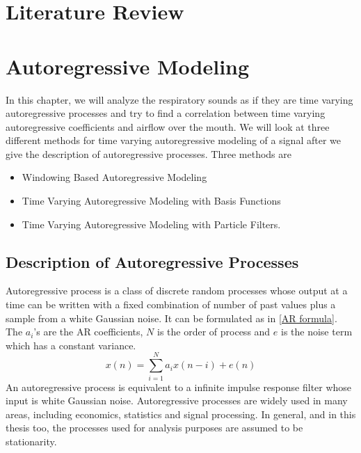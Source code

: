 \documentclass[a4paper,onesided,12pt]{report}
\begin{document}
\section{Literature Review}
\section{Autoregressive Modeling}
In this chapter, we will analyze the respiratory sounds as if they are time varying autoregressive processes and try to find a correlation between time varying autoregressive coefficients and airflow over the mouth. 
We will look at three different methods for time varying autoregressive modeling of a signal after we give the description of autoregressive processes. Three methods are 
\begin{itemize}
	\item Windowing Based Autoregressive Modeling
	\item Time Varying Autoregressive Modeling with Basis Functions
	\item Time Varying Autoregressive Modeling with Particle Filters.
\end{itemize}
\subsection{Description of Autoregressive Processes}
Autoregressive process is a class of discrete random processes whose output at a time can be written with a fixed combination of number of past values plus a sample from a white Gaussian noise. It can be formulated as in \ref{AR formula}. The $a_{i}$'s are the AR coefficients, $N$ is the order of process and $e$ is the noise term which has a constant variance. 
\begin{equation}\label{AR formula}
x(n) = \sum_{i=1}^{N}{a_ix(n-i)} + e(n) 
\end{equation}
An autoregressive process is equivalent to a infinite impulse response filter whose input is white Gaussian noise. 
Autoregressive processes are widely used in many areas, including economics, statistics and signal processing. In general, and in this thesis too, the processes used for analysis purposes are assumed to be stationarity.
\end{document}
